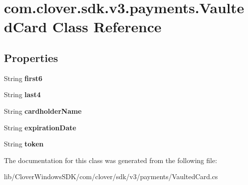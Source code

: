 \hypertarget{classcom_1_1clover_1_1sdk_1_1v3_1_1payments_1_1_vaulted_card}{}\section{com.\+clover.\+sdk.\+v3.\+payments.\+Vaulted\+Card Class Reference}
\label{classcom_1_1clover_1_1sdk_1_1v3_1_1payments_1_1_vaulted_card}
\subsection*{Properties}
\begin{DoxyCompactItemize}
\item 
\mbox{\label{classcom_1_1clover_1_1sdk_1_1v3_1_1payments_1_1_vaulted_card_a6cc61e7df7142a9fca26ce43cef4bf98}} 
String {\bfseries first6}
\item 
\mbox{\label{classcom_1_1clover_1_1sdk_1_1v3_1_1payments_1_1_vaulted_card_a71a1ca96354484b0bf6340892e413e6c}} 
String {\bfseries last4}
\item 
\mbox{\label{classcom_1_1clover_1_1sdk_1_1v3_1_1payments_1_1_vaulted_card_aec5ef8591ada1cdaed8de60479a714fd}} 
String {\bfseries cardholder\+Name}
\item 
\mbox{\label{classcom_1_1clover_1_1sdk_1_1v3_1_1payments_1_1_vaulted_card_a53a50bef5ce2d4591c3d89a47003b135}} 
String {\bfseries expiration\+Date}
\item 
\mbox{\label{classcom_1_1clover_1_1sdk_1_1v3_1_1payments_1_1_vaulted_card_a91c3f160d31fa26e2ac2d22c5ea3e6f1}} 
String {\bfseries token}
\end{DoxyCompactItemize}


The documentation for this class was generated from the following file\+:\begin{DoxyCompactItemize}
\item 
lib/\+Clover\+Windows\+S\+D\+K/com/clover/sdk/v3/payments/Vaulted\+Card.\+cs\end{DoxyCompactItemize}
